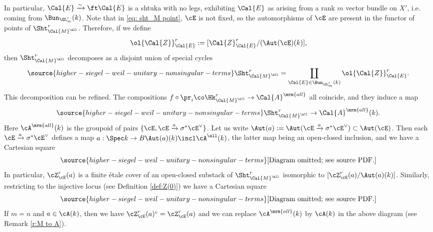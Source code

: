 In particular, $\Cal{E} \xrightarrow{\sim} \ft \Cal{E}$ is a shtuka with no legs, exhibiting $\Cal{E}$ as arising from a rank $m$ vector bundle on $X'$, i.e. coming from $\Bun_{\GL'_m}(k)$. Note that in \eqref{eq: sht_M point}, $\cE$ is not fixed, so the automorphisms of $\cE$ are present in the functor of points of $\Sht_{\Cal{M}^{\all}}^{r}$. Therefore, if we define
\[
\ol{\Cal{Z}}_{\Cal{E}}^{r} :=  [\Cal{Z}_{\Cal{E}}^{r} /  (\Aut(\cE)(k)],
\]
then $\Sht_{\Cal{M}^{\all}}^{r}$ decomposes as a disjoint union of special cycles
\begin{equation}\label{eq: hitchin shtuka decomposition E}
\source{higher-siegel-weil-unitary-nonsingular-terms}
\Sht_{\Cal{M}^{\all}}^{r} = \coprod_{\Cal{E} \in \Bun_{\GL_{m}'}(k)} \ol{\Cal{Z}}_{\Cal{E}}^{r}.
\end{equation}
This decomposition can be refined.
The compositions $f \circ \pr_i \co \Hk_{\Cal{M}^{\all}}^{r} \rightarrow \Cal{A}^{\mrm{all}}$ all coincide, and they induce a map
\begin{equation}\label{eq: hitchin shtuka decomposition A}
\source{higher-siegel-weil-unitary-nonsingular-terms}
\Sht_{\Cal{M}^{\all}}^{r} \rightarrow \Cal{A}^{\mrm{all}}(k).
\end{equation}
Here $\cA^{\mrm{all}}(k)$ is the groupoid of pairs $\{\cE, \cE \xrightarrow{a} \sigma^* \cE^\vee\}$. Let us write $\Aut(a) := \Aut(\cE \xrightarrow{a} \sigma^* \cE^\vee)\subset \Aut(\cE)$. Then each $\cE \xrightarrow{a} \sigma^* \cE^\vee$ defines a map $a: \Spec k \to B \Aut(a)(k)\incl \cA^{\all}(k)$, the latter map being an open-closed inclusion, and we have a Cartesian square
\begin{equation}\label{eq: hitchin shtuka decomposition E and A}
\source{higher-siegel-weil-unitary-nonsingular-terms}
\text{[Diagram omitted; see source PDF.]}
\end{equation}
In particular, $\cZ_{\cE}^r(a)$ is a finite \'{e}tale cover of an open-closed substack of $\Sht_{\Cal{M}^{\all}}^{r}$ isomorphic to $[\cZ_{\cE}^r(a)/\Aut(a)(k)]$.
Similarly, restricting to the injective locus (see Definition \ref{def:Z(0)}) we have a
Cartesian square
\begin{equation}\label{eq: hitchin shtuka decomposition E and A inj}
\source{higher-siegel-weil-unitary-nonsingular-terms}
\text{[Diagram omitted; see source PDF.]}
\end{equation}
If $m=n$ and $a\in \cA(k)$, then we have $\cZ_{\cE}^r(a)^{\circ}=\cZ_{\cE}^r(a)$ and we can replace $ \cA^{\mrm{all}}(k)$ by $ \cA(k)$ in the above diagram (see Remark \ref{r:M to A}).


